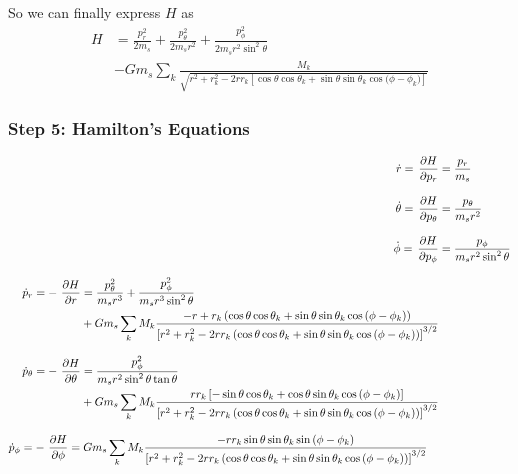So we can finally express \(H\) as
\begin{equation}
    \begin{aligned}
        H &= \frac{p_r^2}{2 m_s} + \frac{p_\theta^2}{2 m_s r^2} + \frac{p_\phi^2}{2 m_s r^2 \sin^2{\theta}} \\
        &- G m_s \sum\limits_{k} \frac{M_k}{\sqrt{r^2 + r_k^2 - 2 r r_k \left[\cos{\theta}\cos{\theta_k}+\sin{\theta}\sin{\theta_k}\cos{(\phi - \phi_k})\right]}}
    \end{aligned}
\end{equation}

\subsubsection{Step 5: Hamilton's Equations}
\begin{align}
    \dot{r} = \operatorname{}\frac{\partial H}{\partial p_r} &= \frac{p_r}{m_s} \label{eq:rdot} \\[0.3cm]
    \dot{\theta} = \operatorname{}\frac{\partial H}{\partial p_\theta} &= \frac{p_\theta}{m_s r^2} \label{eq:thetadot} \\[0.3cm]
    \dot{\phi} = \operatorname{}\frac{\partial H}{\partial p_\phi} &= \frac{p_\phi}{m_s r^2 \sin^2{\theta}} \label{eq:phidot}  \\[0.3cm]
    \begin{split}
        \dot{p}_r = -\operatorname{}\frac{\partial H}{\partial r} &= \frac{p_\theta^2}{m_s r^3} + \frac{p_\phi^2}{m_s r^3 \sin^2{\theta} } \\
        &+ G m_s \sum\limits_{k} M_k \frac{-r + r_k \left(\cos{\theta}\cos{\theta_k} + \sin{\theta}\sin{\theta_k}\cos{(\phi - \phi_k)}\right)}{\left[r^2 + r_k^2 - 2 r r_k \left(\cos{\theta}\cos{\theta_k} + \sin{\theta}\sin{\theta_k}\cos{(\phi - \phi_k)} \right) \right]^{3/2}} \label{eq:prdot}
    \end{split} \\[0.3cm]
    \begin{split}
        \dot{p}_\theta = -\operatorname{}\frac{\partial H}{\partial \theta} &= \frac{p_\phi^2}{m_s r^2 \sin^2{\theta} \tan{\theta}} \\
        &+ G m_s \sum\limits_{k} M_k \frac{r r_k \left[-\sin{\theta}\cos{\theta_k} + \cos{\theta}\sin{\theta_k}\cos{(\phi - \phi_k)} \right]}{\left[r^2 + r_k^2 - 2 r r_k \left(\cos{\theta}\cos{\theta_k} + \sin{\theta}\sin{\theta_k}\cos{(\phi - \phi_k)} \right) \right]^{3/2}} \label{eq:pthetadot}
    \end{split} \\[0.3cm]
    \begin{split}
        \dot{p}_\phi = -\operatorname{}\frac{\partial H}{\partial \phi} &= G m_s \sum\limits_{k} M_k \frac{- r r_k \sin{\theta}\sin{\theta_k}\sin{(\phi - \phi_k)}}{\left[r^2 + r_k^2 - 2 r r_k \left(\cos{\theta}\cos{\theta_k} + \sin{\theta}\sin{\theta_k}\cos{(\phi - \phi_k)} \right) \right]^{3/2}} \label{eq:pphidot}
    \end{split}
\end{align}

